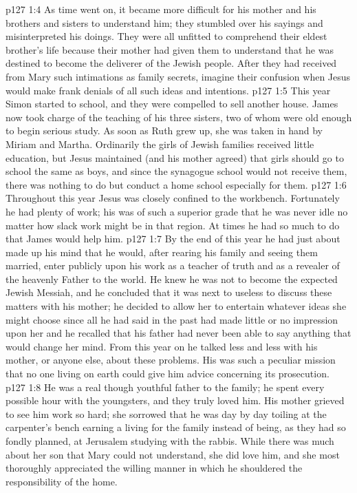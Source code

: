 \vs p127 1:4 \pc As time went on, it became more difficult for his mother and his brothers and sisters to understand him; they stumbled over his sayings and misinterpreted his doings. They were all unfitted to comprehend their eldest brother’s life because their mother had given them to understand that he was destined to become the deliverer of the Jewish people. After they had received from Mary such intimations as family secrets, imagine their confusion when Jesus would make frank denials of all such ideas and intentions.
\vs p127 1:5 \pc This year Simon started to school, and they were compelled to sell another house. James now took charge of the teaching of his three sisters, two of whom were old enough to begin serious study. As soon as Ruth grew up, she was taken in hand by Miriam and Martha. Ordinarily the girls of Jewish families received little education, but Jesus maintained (and his mother agreed) that girls should go to school the same as boys, and since the synagogue school would not receive them, there was nothing to do but conduct a home school especially for them.
\vs p127 1:6 Throughout this year Jesus was closely confined to the workbench. Fortunately he had plenty of work; his was of such a superior grade that he was never idle no matter how slack work might be in that region. At times he had so much to do that James would help him.
\vs p127 1:7 By the end of this year he had just about made up his mind that he would, after rearing his family and seeing them married, enter publicly upon his work as a teacher of truth and as a revealer of the heavenly Father to the world. He knew he was not to become the expected Jewish Messiah, and he concluded that it was next to useless to discuss these matters with his mother; he decided to allow her to entertain whatever ideas she might choose since all he had said in the past had made little or no impression upon her and he recalled that his father had never been able to say anything that would change her mind. From this year on he talked less and less with his mother, or anyone else, about these problems. His was such a peculiar mission that no one living on earth could give him advice concerning its prosecution.
\vs p127 1:8 He was a real though youthful father to the family; he spent every possible hour with the youngsters, and they truly loved him. His mother grieved to see him work so hard; she sorrowed that he was day by day toiling at the carpenter’s bench earning a living for the family instead of being, as they had so fondly planned, at Jerusalem studying with the rabbis. While there was much about her son that Mary could not understand, she did love him, and she most thoroughly appreciated the willing manner in which he shouldered the responsibility of the home.
